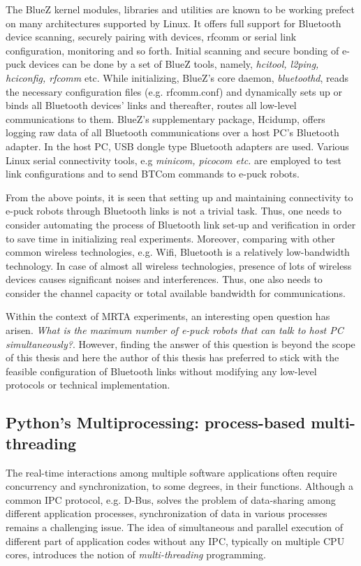 The BlueZ kernel modules, libraries and utilities are known to be working prefect on many architectures supported by Linux. It offers full support for Bluetooth device scanning, securely pairing with devices,  rfcomm or serial link configuration, monitoring and so forth. Initial  scanning and secure bonding of e-puck devices can be done by a set of BlueZ tools, namely, {\em hcitool, l2ping, hciconfig, rfcomm} etc. While initializing, BlueZ's  core daemon, {\em bluetoothd}, reads the necessary configuration files (e.g. rfcomm.conf) and dynamically sets up or binds all Bluetooth devices' links and thereafter, routes all low-level communications to them. BlueZ's supplementary package, Hcidump, offers logging raw data of all Bluetooth communications over a host PC's Bluetooth adapter.  In the host PC,  USB dongle type  Bluetooth adapters are used. Various Linux serial connectivity tools, e.g {\em minicom, picocom etc.} are employed to test link configurations and to send BTCom commands to e-puck robots.

From the above points, it is seen that setting up and maintaining connectivity to e-puck robots through Bluetooth links is  not a trivial task. Thus, one needs to consider automating the process of Bluetooth link set-up and verification in order to save time in initializing real experiments. Moreover, comparing with other common wireless technologies, e.g. Wifi, Bluetooth is a relatively low-bandwidth technology. In case of almost all wireless technologies, presence of lots of wireless devices  causes significant noises and interferences. Thus, one also needs to consider the channel capacity or total available bandwidth for communications. 

Within the context of MRTA experiments, an interesting open question has arisen. {\em What is the maximum number of e-puck robots that can talk to host PC simultaneously?}. However, finding the answer of this question is beyond the scope of this thesis and here the author of this thesis  has preferred to stick with the feasible configuration of Bluetooth links without modifying any low-level protocols or technical implementation.
\subsection{Python's Multiprocessing: process-based multi-threading}
\label{expt-tools:python}
The real-time interactions among multiple software applications often require concurrency and synchronization, to some degrees, in their functions. Although a common IPC protocol, e.g. D-Bus, solves the problem of data-sharing among different application processes, synchronization of data in various processes remains a challenging issue.   The idea of simultaneous and parallel execution of different part of application codes without any IPC, typically on  multiple CPU cores, introduces the notion of {\em multi-threading} programming. 

